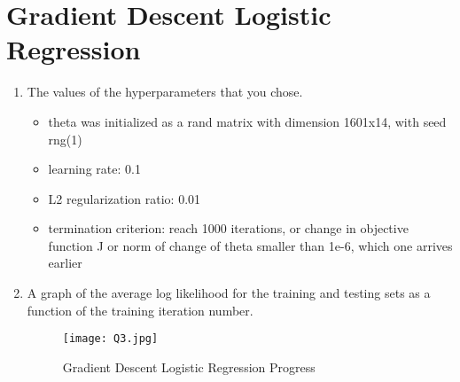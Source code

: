 \documentclass[12pt]{article}
\begin{document}
\newpage
\section{Gradient Descent Logistic Regression}\label{linreg}

\begin{enumerate}
\item The values of the hyperparameters that you chose.\\
\begin{itemize}
\item theta was initialized as a rand matrix with dimension 1601x14, with seed rng(1)
\item learning rate: 0.1
\item L2 regularization ratio: 0.01
\item termination criterion:  reach 1000 iterations, or change in objective function J or norm of change of theta smaller than 1e-6, which one arrives earlier   
\end{itemize}

\item A graph of the average log likelihood for the training and testing sets as a function of the training iteration number.
\begin{figure}[H]
\begin{center}
\texttt{[image: Q3.jpg]}
\caption{Gradient Descent Logistic Regression Progress}
\end{center}
\end{figure}


\end{enumerate}
\end{document}
